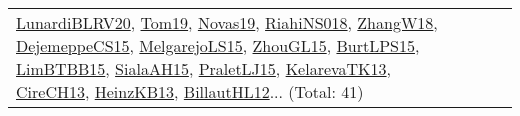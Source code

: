 {\begin{longtable}{lp{3cm}>{\raggedright}p{6cm}>{\raggedright}p{6cm}p{8cm}}
\href{articles/LunardiBLRV20.pdf}{LunardiBLRV20}\cite{LunardiBLRV20}, \href{papers/Tom19.pdf}{Tom19}\cite{Tom19}, \href{articles/Novas19.pdf}{Novas19}\cite{Novas19}, \href{papers/RiahiNS018.pdf}{RiahiNS018}\cite{RiahiNS018}, \href{articles/ZhangW18.pdf}{ZhangW18}\cite{ZhangW18}, \href{papers/DejemeppeCS15.pdf}{DejemeppeCS15}\cite{DejemeppeCS15}, \href{papers/MelgarejoLS15.pdf}{MelgarejoLS15}\cite{MelgarejoLS15}, \href{papers/ZhouGL15.pdf}{ZhouGL15}\cite{ZhouGL15}, \href{papers/BurtLPS15.pdf}{BurtLPS15}\cite{BurtLPS15}, \href{papers/LimBTBB15.pdf}{LimBTBB15}\cite{LimBTBB15}, \href{papers/SialaAH15.pdf}{SialaAH15}\cite{SialaAH15}, \href{papers/PraletLJ15.pdf}{PraletLJ15}\cite{PraletLJ15}, \href{papers/KelarevaTK13.pdf}{KelarevaTK13}\cite{KelarevaTK13}, \href{papers/CireCH13.pdf}{CireCH13}\cite{CireCH13}, \href{papers/HeinzKB13.pdf}{HeinzKB13}\cite{HeinzKB13}, \href{papers/BillautHL12.pdf}{BillautHL12}\cite{BillautHL12}... (Total: 41)\\

\end{longtable}}
